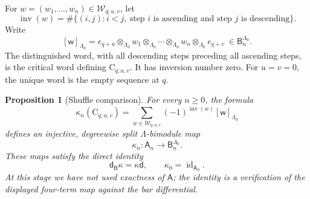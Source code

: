 \documentclass[a4paper,11pt,oneside,reqno]{amsart}
\newtheorem{proposition}[theorem]{Proposition}
\theoremstyle{definition}
\numberwithin{equation}{section}
\begin{document}
For $w=(w_1,\ldots,w_n)\in\mathcal W_{q;u,v}$, let
\[
 \operatorname{inv}(w)
 =\#\{(i,j):i<j,\ \text{step $i$ is ascending and
 step $j$ is descending}\}.
\]
Write
\[
 \mathsf{[w]}_{\Lambda_0}
 =e_{q+u}\otimes_{\Lambda_0}w_1\otimes_{\Lambda_0}\cdots
 \otimes_{\Lambda_0}w_n\otimes_{\Lambda_0}e_{q+v}
 \ \in\mathsf B_n^{\Lambda_0}.
\]
The distinguished word, with all descending steps preceding all
ascending steps, is the critical word defining $\mathrm C_{q;u,v}$.
It has inversion number zero. For $u=v=0$, the unique word is the
empty sequence at $q$.

\begin{proposition}[Shuffle comparison]\label{cup:prop:comparison}
For every $n\geq0$, the formula
\begin{equation}\label{cup:eq:kappa}
 \boxed{\displaystyle
 \kappa_n(\mathrm C_{q;u,v})
 =\sum_{w\in\mathcal W_{q;u,v}}
 (-1)^{\operatorname{inv}(w)}\mathsf{[w]}_{\Lambda_0}}
\end{equation}
defines an injective, degreewise split $\Lambda$-bimodule map
\[
 \kappa_n:\mathsf A_n\longrightarrow\mathsf B_n^{\Lambda_0}.
\]
These maps satisfy the direct identity
\begin{equation}\label{cup:eq:kappa-chain}
 \mathsf d_{\mathsf B}\kappa=\kappa\mathsf d,
 \qquad \kappa_0=\operatorname{id}_{\mathsf A_0}.
\end{equation}
At this stage we have not used exactness of $\mathsf A$; the identity is
a verification of the displayed four-term map against the bar differential.
\end{proposition}
\end{document}
